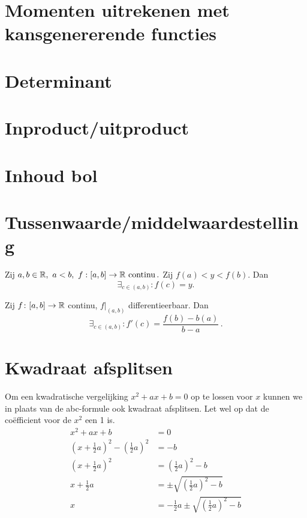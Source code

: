 \documentclass{article}
\begin{document}
    \section{Momenten uitrekenen met kansgenererende functies}
    

    \section{Determinant}\label{sec:determinant}
    

    \section{Inproduct/uitproduct}\label{sec:inproduct/uitproduct}
    

    \section{Inhoud bol}\label{sec:inhoudBol}
    

    \section{Tussenwaarde/middelwaardestelling}\label{sec:tussenwaarde/middelwaardestelling}
    \begin{stelling}

        Zij $a,b \in \mathbb{R},\ a<b,\
            f:[a,b]\to \mathbb{R} \text{ continu}\,.
        $
        Zij $f(a)<y<f(b)$.
        Dan \[ \exists_{c\in(a,b)}:f(c)=y. \]
    \end{stelling}

    \begin{stelling}

        Zij $f\colon[a,b] \to \mathbb{R}$ continu, $f|_{(a,b)}$ differentieerbaar.
        Dan
        \[
            \exists_{c \in (a,b)} : f'(c) = \frac{f(b)-b(a)}{b-a}\,.
        \]
    \end{stelling}

    \section{Kwadraat afsplitsen}\label{sec:kwadraatAfsplitsen}
    Om een kwadratische vergelijking $x^2 + ax + b = 0$ op te lossen voor $x$ kunnen we in plaats van de abc-formule ook kwadraat afsplitsen.
    Let wel op dat de co\"efficient voor de $x^2$ een 1 is.
    \begin{align*}
        x^2 + a x + b &= 0 \\
        \left(x + \frac{1}{2} a\right)^2 - \left( \frac{1}{2}a \right)^2 &= - b \\
        \left(x + \frac{1}{2} a\right)^2 &= \left( \frac{1}{2}a \right)^2 - b \\
        x + \frac{1}{2} a &= \pm \sqrt{\left( \frac{1}{2}a \right)^2 - b} \\
        x &= -  \frac{1}{2} a \pm \sqrt{\left(\frac{1}{2}a \right)^2 - b}
    \end{align*}
\end{document}
